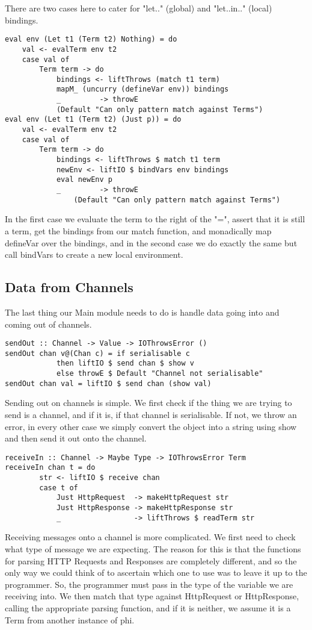 There are two cases here to cater for "let.." (global) and "let..in.." (local) bindings.
\begin{verbatim}
eval env (Let t1 (Term t2) Nothing) = do 
    val <- evalTerm env t2 
    case val of 
        Term term -> do
            bindings <- liftThrows (match t1 term)
            mapM_ (uncurry (defineVar env)) bindings
            _         -> throwE 
            (Default "Can only pattern match against Terms")
eval env (Let t1 (Term t2) (Just p)) = do
    val <- evalTerm env t2 
    case val of 
        Term term -> do
            bindings <- liftThrows $ match t1 term
            newEnv <- liftIO $ bindVars env bindings
            eval newEnv p
            _         -> throwE 
                (Default "Can only pattern match against Terms")
\end{verbatim}
In the first case we evaluate the term to the right of the "=", assert that it is still a term, get the bindings from our match function, and monadically map defineVar over the bindings, and in the second case we do exactly the same but call bindVars to create a new local environment.

\subsection{Data from Channels}

The last thing our Main module needs to do is handle data going into and coming out of channels.
\label{sec:sendout}
\begin{verbatim}
sendOut :: Channel -> Value -> IOThrowsError () 
sendOut chan v@(Chan c) = if serialisable c
            then liftIO $ send chan $ show v
            else throwE $ Default "Channel not serialisable" 
sendOut chan val = liftIO $ send chan (show val)
\end{verbatim}
Sending out on channels is simple. We first check if the thing we are trying to send is a channel, and if it is, if that channel is serialisable. If not, we throw an error, in every other case we simply convert the object into a string using show and then send it out onto the channel.

\label{sec:receiveIn}
\begin{verbatim}
receiveIn :: Channel -> Maybe Type -> IOThrowsError Term
receiveIn chan t = do
        str <- liftIO $ receive chan
        case t of
            Just HttpRequest  -> makeHttpRequest str
            Just HttpResponse -> makeHttpResponse str
            _                 -> liftThrows $ readTerm str
\end{verbatim}
Receiving messages onto a channel is more complicated. We first need to check what type of message we are expecting. The reason for this is that the functions for parsing HTTP Requests and Responses are completely different, and so the only way we could think of to ascertain which one to use was to leave it up to the programmer. So, the programmer must pass in the type of the variable we are receiving into. We then match that type against HttpRequest or HttpResponse, calling the appropriate
parsing function, and if it is neither, we assume it is a Term from another instance of phi.

